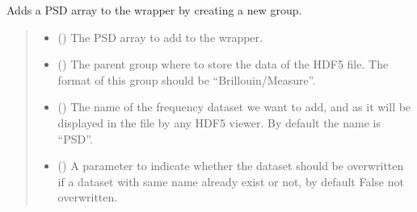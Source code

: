 \documentclass[letterpaper,10pt,english]{sphinxmanual}
\begin{document}
\begin{fulllineitems}

\begin{fulllineitems}
\label{\detokenize{source/_autosummary/HDF5_BLS.Wrapper:HDF5_BLS.Wrapper.add_PSD}}
\pysigstartsignatures
\pysiglinewithargsret
{}
{\sphinxparamcomma {}\sphinxparamcomma {}\sphinxparamcomma {}}
{}
\pysigstopsignatures
\sphinxAtStartPar
Adds a PSD array to the wrapper by creating a new group.
\begin{quote}\begin{description}
\begin{itemize}
\item {} 
\sphinxAtStartPar
{} () \textendash{} The PSD array to add to the wrapper.

\item {} 
\sphinxAtStartPar
{} (\sphinxstyleliteralemphasis{\sphinxupquote{, }}) \textendash{} The parent group where to store the data of the HDF5 file. The format of this group should be “Brillouin/Measure”.

\item {} 
\sphinxAtStartPar
{} (\sphinxstyleliteralemphasis{\sphinxupquote{, }}) \textendash{} The name of the frequency dataset we want to add, and as it will be displayed in the file by any HDF5 viewer. By default the name is “PSD”.

\item {} 
\sphinxAtStartPar
{} (\sphinxstyleliteralemphasis{\sphinxupquote{, }}) \textendash{} A parameter to indicate whether the dataset should be overwritten if a dataset with same name already exist or not, by default False \sphinxhyphen{} not overwritten.


\end{itemize}
\end{description}
\end{quote}
\end{fulllineitems}
\end{fulllineitems}
\end{document}
